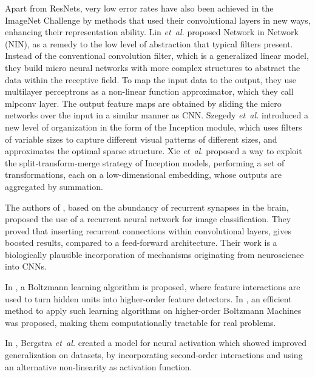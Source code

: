 \documentclass[10pt,twocolumn,letterpaper]{article}
\begin{document}
     Apart from ResNets, very low error rates have also been achieved in the ImageNet Challenge \cite{Russakovsky2015} by methods that used their convolutional layers in new ways, enhancing their representation ability. Lin \textit{et~al.} \cite{Nin14} proposed Network in Network (NIN), as a remedy to the low level of abstraction that typical filters present. Instead of the conventional convolution filter, which is a generalized linear model, they build micro neural networks with more complex structures to abstract the data within the receptive field. To map the input data to the output, they use multilayer perceptrons as a non-linear function approximator, which they call mlpconv layer. The output feature maps are obtained by sliding the micro networks over the input in a similar manner as CNN. Szegedy \textit{et~al.} \cite{Szegedy15} introduced a new level of organization in the form of the Inception module, which uses filters of variable sizes to capture different visual patterns of different sizes, and approximates the optimal sparse structure. Xie \textit{et~al.} \cite{ResNeXt16} proposed a way to exploit the split-transform-merge strategy of Inception models, performing a set of transformations, each on a low-dimensional embedding, whose outputs are aggregated by summation.
     
     The authors of \cite{RCNN15}, based on the abundancy of recurrent synapses in the brain, proposed the use of a recurrent neural network for image classification. They proved that inserting recurrent connections within convolutional layers, gives boosted results, compared to a feed-forward architecture. Their work is a biologically plausible incorporation of mechanisms originating from neuroscience into CNNs.
     
	In \cite{Sejnowski86}, a Boltzmann learning algorithm is proposed, where feature interactions are used to turn hidden units into higher-order feature detectors. In \cite{SHBM14}, an efficient method to apply such learning algorithms on higher-order Boltzmann Machines was proposed, making them computationally tractable for real problems.
     
     In \cite{Bengio09}, Bergstra \textit{et~al.} created a model for neural activation which showed improved generalization on datasets, by incorporating second-order interactions and using an alternative non-linearity as activation function.
      
\end{document}
